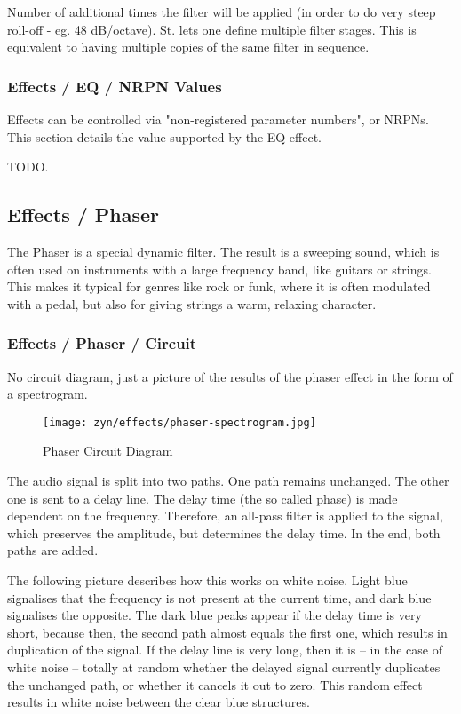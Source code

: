    Number of additional times the filter will be applied (in
   order to do very steep roll-off - eg. 48 dB/octave).
   St. lets one define multiple filter stages. This is equivalent to
   having multiple copies of the same filter in sequence.

\subsubsection{Effects / EQ / NRPN Values}
\label{subsubsec:effects_edit_eq_nrpn}

   Effects can be controlled via "non-registered parameter numbers", or NRPNs.
   This section details the value supported by the EQ effect.

   TODO.

\subsection{Effects / Phaser}
\label{subsec:effects_edit_phaser}

   The Phaser is a special dynamic filter. The result is a sweeping sound,
   which is often used on instruments with a large frequency band, like
   guitars or strings. This makes it typical for genres like rock or funk,
   where it is often modulated with a pedal, but also for giving strings a
   warm, relaxing character.

\subsubsection{Effects / Phaser / Circuit}
\label{subsubsec:effects_edit_phaser_circuit}

   No circuit diagram, just a picture of the results of the phaser effect in the
   form of a spectrogram.

\begin{figure}[H]
   \centering 
   \texttt{[image: zyn/effects/phaser-spectrogram.jpg]}
   \caption{Phaser Circuit Diagram}
   \label{fig:phaser_circuit_diagram}
\end{figure}

   The audio signal is split into two paths. One path remains unchanged. The
   other one is sent to a delay line. The delay time (the so called phase) is
   made dependent on the frequency. Therefore, an all-pass filter is applied
   to the signal, which preserves the amplitude, but determines the delay
   time. In the end, both paths are added.

   The following picture describes how this works on white noise. Light blue
   signalises that the frequency is not present at the current time, and dark
   blue signalises the opposite. The dark blue peaks appear if the delay time
   is very short, because then, the second path almost equals the first one,
   which results in duplication of the signal. If the delay line is very
   long, then it is -- in the case of white noise -- totally at random
   whether the delayed signal currently duplicates the unchanged path, or
   whether it cancels it out to zero. This random effect results in white
   noise between the clear blue structures.

